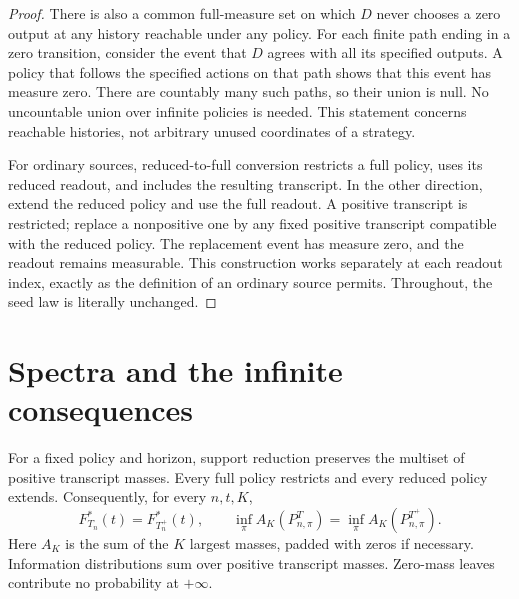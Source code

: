 \documentclass[11pt,a4paper]{article}
\begin{document}
\begin{proof}
There is also a common full-measure set on which $D$ never chooses a zero
output at any history reachable under any policy. For each finite path
ending in a zero transition, consider the event that $D$ agrees with
all its specified outputs. A policy that follows the specified actions
on that path shows that this event has measure zero. There are countably
many such paths, so their union is null. No uncountable union over
infinite policies is needed. This statement concerns reachable histories,
not arbitrary unused coordinates of a strategy.

For ordinary sources, reduced-to-full conversion restricts a full policy,
uses its reduced readout, and includes the resulting transcript.
In the other direction, extend the reduced policy and use the full
readout. A positive transcript is restricted; replace a nonpositive one
by any fixed positive transcript compatible with the reduced policy.
The replacement event has measure zero, and the readout remains measurable.
This construction works separately at each readout index, exactly as the
definition of an ordinary source permits. Throughout, the seed law is
literally unchanged.
\end{proof}

\section{Spectra and the infinite consequences}
For a fixed policy and horizon, support reduction preserves the multiset
of positive transcript masses. Every full policy restricts and every
reduced policy extends. Consequently, for every $n,t,K$,
\begin{equation}\label{eq:spectrum}
 F_{T_n}^*(t)=F_{T_n^+}^*(t),\qquad
 \inf_\pi A_K(P^T_{n,\pi})=\inf_\pi A_K(P^{T^+}_{n,\pi}).
\end{equation}
Here $A_K$ is the sum of the $K$ largest masses, padded with zeros if
necessary. Information distributions sum over positive transcript masses.
Zero-mass leaves contribute no probability at $+\infty$.
\end{document}
